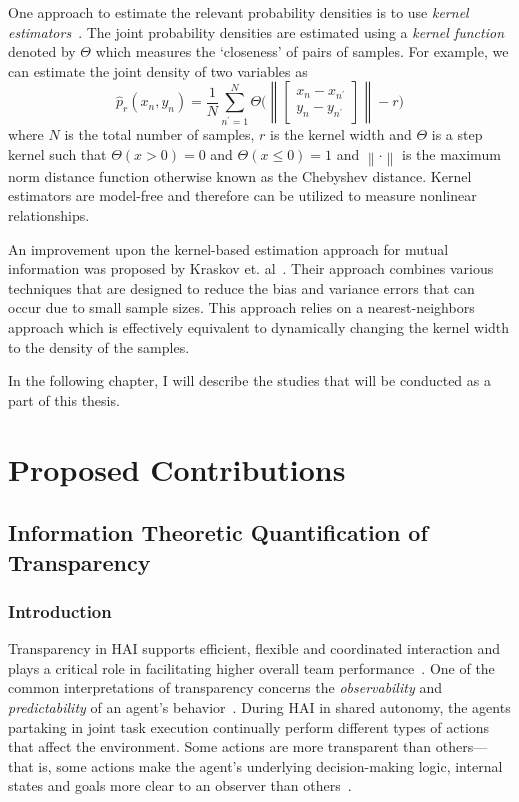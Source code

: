 \documentclass[12pt]{article}
\newcommand{\norm}[1]{\left\lVert#1\right\rVert}
\begin{document}
One approach to estimate the relevant probability densities is to use \textit{kernel estimators}~\cite{silverman1986density}. The joint probability densities are estimated using a \textit{kernel function} denoted by $\Theta$ which measures the `closeness' of pairs of samples. For example, we can estimate the joint density of two variables as 
\begin{equation*}
\hat{p}_r(x_n, y_n) = \frac{1}{N}\sum_{n^{\prime} = 1}^{N}\Theta\Bigg(\norm{\begin{bmatrix}
	x_n - x_{n^{\prime}} \\
	y_n - y_{n^{\prime}}
	\end{bmatrix}}-r\Bigg)
\end{equation*}  
where $N$ is the total number of samples, $r$ is the kernel width and $\Theta$ is a step kernel such that $\Theta(x > 0) = 0$ and $\Theta(x \leq 0) = 1$ and $\norm{\cdot}$ is the maximum norm distance function otherwise known as the Chebyshev distance. Kernel estimators are model-free and therefore can be utilized to measure nonlinear relationships. 

An improvement upon the kernel-based estimation approach for mutual information was proposed by Kraskov et. al~\cite{kraskov2004estimating}. Their approach combines various techniques that are designed to reduce the bias and variance errors that can occur due to small sample sizes. This approach relies on a nearest-neighbors approach which is effectively equivalent to dynamically changing the kernel width to the density of the samples. 

In the following chapter, I will describe the studies that will be conducted as a part of this thesis. 

\pagebreak
\section{Proposed Contributions}
\subsection{Information Theoretic Quantification of  Transparency}\label{study:rq1}

\subsubsection{Introduction}
Transparency in HAI supports efficient, flexible and coordinated interaction and plays a critical role in facilitating higher overall team performance~\cite{lyons2013being}. One of the common interpretations of transparency concerns the \textit{observability} and \textit{predictability} of an agent's behavior~\cite{endsley2017here}. During HAI in shared autonomy, the agents partaking in joint task execution continually perform different types of actions that affect the environment. Some actions are more transparent than others---that is, some actions make the agent's underlying decision-making logic, internal states and goals more clear to an observer than others~\cite{theodorou2017designing}. 
\end{document}
